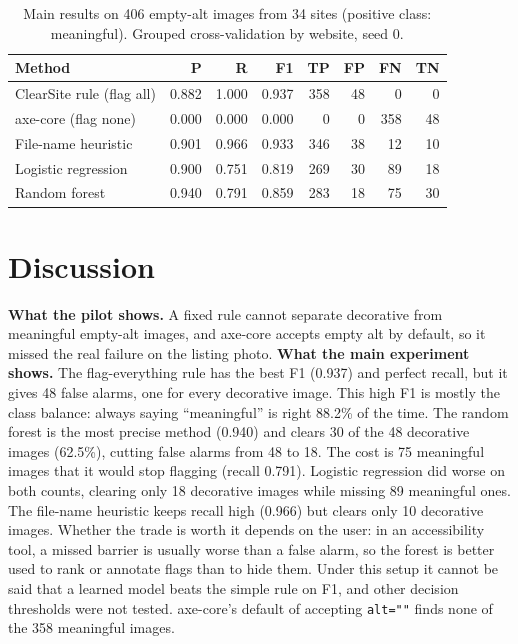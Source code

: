 \documentclass[sigconf,anonymous]{acmart}
\begin{document}
\begin{table}[h]
\caption{Main results on 406 empty-alt images from 34 sites (positive class: meaningful). Grouped cross-validation by website, seed 0.}
\label{tab:main}
\begin{tabular}{lrrrrrrr}
\toprule
Method & P & R & F1 & TP & FP & FN & TN \\
\midrule
ClearSite rule (flag all) & 0.882 & 1.000 & 0.937 & 358 & 48 & 0 & 0 \\
axe-core (flag none) & 0.000 & 0.000 & 0.000 & 0 & 0 & 358 & 48 \\
File-name heuristic & 0.901 & 0.966 & 0.933 & 346 & 38 & 12 & 10 \\
Logistic regression & 0.900 & 0.751 & 0.819 & 269 & 30 & 89 & 18 \\
Random forest & 0.940 & 0.791 & 0.859 & 283 & 18 & 75 & 30 \\
\bottomrule
\end{tabular}
\end{table}

\section{Discussion}
\textbf{What the pilot shows.} A fixed rule cannot separate decorative from meaningful empty-alt images, and axe-core accepts empty alt by default, so it missed the real failure on the listing photo. \textbf{What the main experiment shows.} The flag-everything rule has the best F1 (0.937) and perfect recall, but it gives 48 false alarms, one for every decorative image. This high F1 is mostly the class balance: always saying ``meaningful'' is right 88.2\% of the time. The random forest is the most precise method (0.940) and clears 30 of the 48 decorative images (62.5\%), cutting false alarms from 48 to 18. The cost is 75 meaningful images that it would stop flagging (recall 0.791). Logistic regression did worse on both counts, clearing only 18 decorative images while missing 89 meaningful ones. The file-name heuristic keeps recall high (0.966) but clears only 10 decorative images. Whether the trade is worth it depends on the user: in an accessibility tool, a missed barrier is usually worse than a false alarm, so the forest is better used to rank or annotate flags than to hide them. Under this setup it cannot be said that a learned model beats the simple rule on F1, and other decision thresholds were not tested. axe-core's default of accepting \texttt{alt=""} finds none of the 358 meaningful images.
\end{document}
